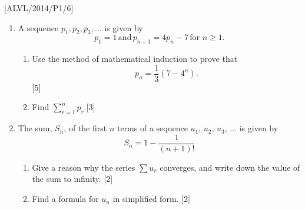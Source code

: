 \item {[}ALVL/2014/P1/6{]}
\begin{enumerate}
\item A sequence $p_{1},p_{2},p_{3},\dots$ is given by 
\[
p_{1}=1\,\text{and}\,p_{n+1}=4p_{n}-7\,\text{for }n\geq1.
\]

\begin{enumerate}
\item Use the method of mathematical induction to prove that 
\[
p_{n}=\frac{1}{3}\left(7-4^{n}\right).
\]
\hfill{} {[}5{]}
\item Find $\sum_{r=1}^{n}p_{r}$.\hfill{}{[}3{]}
\end{enumerate}
\item The sum, $S_{n}$, of the first $n$ terms of a sequence $u_{1}$,
$u_{2}$, $u_{3}$, $\dots$ is given by 
\[
S_{n}=1-\frac{1}{\left(n+1\right)!}
\]
 
\begin{enumerate}
\item Give a reason why the series $\sum u_{r}$ converges, and write down
the value of the sum to infinity. \hfill{}{[}2{]}
\item Find a formula for $u_{n}$ in simplified form. \hfill{}{[}2{]}
\end{enumerate}
\end{enumerate}
